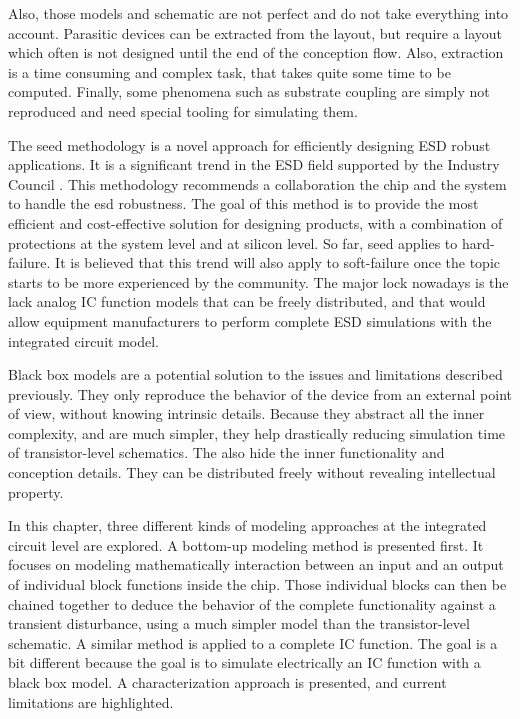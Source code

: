 Also, those models and schematic are not perfect and do not take everything into account.
Parasitic devices can be extracted from the layout, but require a layout which often is not designed until the end of the conception flow.
Also, extraction is a time consuming and complex task, that takes quite some time to be computed.
Finally, some phenomena such as substrate coupling are simply not reproduced and need special tooling for simulating them.

The \gls{seed} methodology is a novel approach for efficiently designing ESD robust applications.
It is a significant trend in the ESD field supported by the Industry Council \cite{seed}.
This methodology recommends a collaboration the chip and the system to handle the \gls{esd} robustness.
The goal of this method is to provide the most efficient and cost-effective solution for designing products, with a combination of protections at the system level and at silicon level.
So far, \gls{seed} applies to hard-failure.
It is believed that this trend will also apply to soft-failure once the topic starts to be more experienced by the community.
The major lock nowadays is the lack analog IC function models that can be freely distributed, and that would allow equipment manufacturers to perform complete ESD simulations with the integrated circuit model.

Black box models are a potential solution to the issues and limitations described previously.
They only reproduce the behavior of the device from an external point of view, without knowing intrinsic details.
Because they abstract all the inner complexity, and are much simpler, they help drastically reducing simulation time of transistor-level schematics.
The also hide the inner functionality and conception details.
They can be distributed freely without revealing intellectual property.

In this chapter, three different kinds of modeling approaches at the integrated circuit level are explored.
A bottom-up modeling method is presented first.
It focuses on modeling mathematically interaction between an input and an output of individual block functions inside the chip.
Those individual blocks can then be chained together to deduce the behavior of the complete functionality against a transient disturbance, using a much simpler model than the transistor-level schematic.
A similar method is applied to a complete IC function.
The goal is a bit different because the goal is to simulate electrically an IC function with a black box model.
A characterization approach is presented, and current limitations are highlighted.

